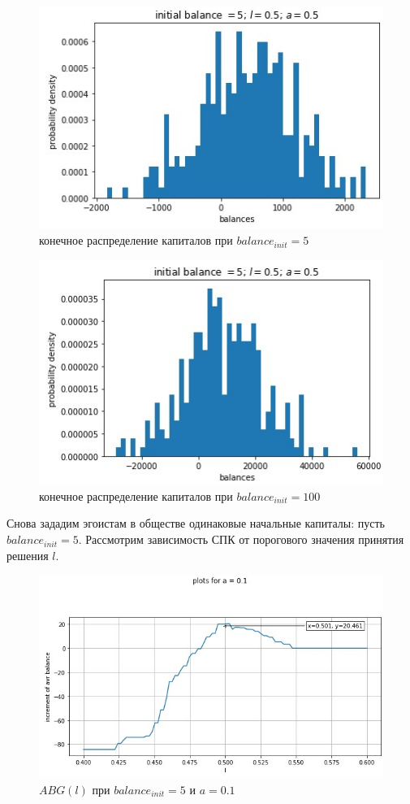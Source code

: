 \documentclass{article}
\begin{document}
\begin{figure}[H]
	\begin{minipage}[h]{0.49\linewidth}
		\centering
		\includegraphics[width=1.0\linewidth]{assets/init_balance_5.jpg}
		конечное распределение капиталов \newline при $balance_{init} = 5$
	\end{minipage}
	\hfill
\begin{minipage}[h]{0.49\linewidth}
	\centering
	\includegraphics[width=1.0\linewidth]{assets/init_balance_100.jpg}
	конечное распределение капиталов \newline при $balance_{init} = 100$
\end{minipage}
\end{figure}
\null\newpage
Снова зададим эгоистам в обществе одинаковые начальные капиталы: пусть $balance_{init} = 5$. Рассмотрим зависимость СПК от порогового значения принятия решения $l$.
\begin{figure}[H]
	\centering
	\includegraphics[width=0.6\linewidth]{assets/one_value_distribution/plot_a01.jpg}
	\caption{$ABG(l)$ при $balance_{init} = 5$ и $a = 0.1$}
\end{figure}
\end{document}
